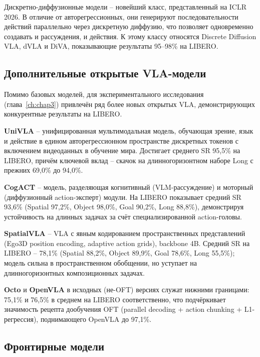     Дискретно-диффузионные модели -- новейший класс, представленный на ICLR 2026. В отличие от авторегрессионных, они генерируют последовательности действий параллельно через дискретную диффузию, что позволяет одновременно создавать и рассуждения, и действия. К этому классу относятся Discrete Diffusion VLA, dVLA и DiVA, показывающие результаты 95--98\% на LIBERO.

\subsection{Дополнительные открытые VLA-модели}
\label{subsec:more_vla}

    Помимо базовых моделей, для экспериментального исследования (глава~\ref{ch:chap3}) привлечён ряд более новых открытых VLA, демонстрирующих конкурентные результаты на LIBERO.

    \textbf{UniVLA} \cite{univla2025} -- унифицированная мультимодальная модель, обучающая зрение, язык и действие в едином авторегрессионном пространстве дискретных токенов с включением видеоданных в обучение мира. Достигает среднего SR 95,5\% на LIBERO, причём ключевой вклад -- скачок на длинногоризонтном наборе Long с прежних 69,0\% до 94,0\%.

    \textbf{CogACT} \cite{cogact2024} -- модель, разделяющая когнитивный (VLM-рассуждение) и моторный (диффузионный action-эксперт) модули. На LIBERO показывает средний SR 93,6\% (Spatial 97,2\%, Object 98,0\%, Goal 90,2\%, Long 88,8\%), демонстрируя устойчивость на длинных задачах за счёт специализированной action-головы.

    \textbf{SpatialVLA} \cite{spatialvla2025} -- VLA с явным кодированием пространственных представлений (Ego3D position encoding, adaptive action grids), backbone 4B. Средний SR на LIBERO -- 78,1\% (Spatial 88,2\%, Object 89,9\%, Goal 78,6\%, Long 55,5\%); модель сильна в пространственном обобщении, но уступает на длинногоризонтных композиционных задачах.

    \textbf{Octo} \cite{octo2024} и \textbf{OpenVLA} \cite{kim2024openvla} в исходных (не-OFT) версиях служат нижними границами: 75,1\% и 76,5\% в среднем на LIBERO соответственно, что подчёркивает значимость рецепта дообучения OFT (parallel decoding + action chunking + L1-регрессия), поднимающего OpenVLA до 97,1\%.

\subsection{Фронтирные модели}
\label{subsec:frontier}

